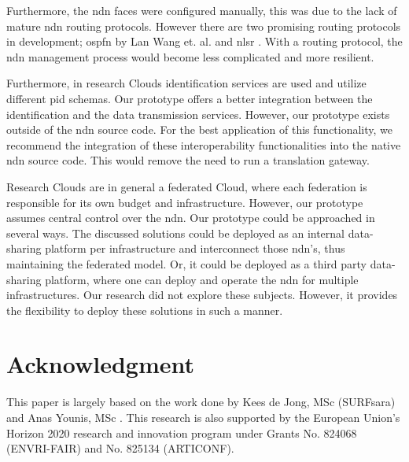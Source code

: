 \documentclass[conference]{IEEEtran}
\begin{document}
Furthermore, the \gls{ndn} faces were configured manually, this was due to the lack of mature \gls{ndn} routing protocols. However there are two promising routing protocols in development; \gls{ospfn} by Lan Wang et. al. \cite{ndn-ospfn2} and \gls{nlsr} \cite{nlsr}. With a routing protocol, the \gls{ndn} management process would become less complicated and more resilient.

Furthermore, in research Clouds identification services are used and utilize different \gls{pid} schemas. Our prototype offers a better integration between the identification and the data transmission services. However, our prototype exists outside of the \gls{ndn} source code. For the best application of this functionality, we recommend the integration of these interoperability functionalities into the native \gls{ndn} source code. This would remove the need to run a translation gateway.

Research Clouds are in general a federated Cloud, where each federation is responsible for its own budget and infrastructure. However, our prototype assumes central control over the \gls{ndn}. Our prototype could be approached in several ways. The discussed solutions could be deployed as an internal data-sharing platform per infrastructure and interconnect those \gls{ndn}'s, thus maintaining the federated model. Or, it could be deployed as a third party data-sharing platform, where one can deploy and operate the \gls{ndn} for multiple infrastructures. Our research did not explore these subjects. However, it provides the flexibility to deploy these solutions in such a manner.

\section*{Acknowledgment}
This paper is largely based on the work done by Kees de Jong, MSc (SURFsara) and Anas Younis, MSc \cite{de2019planning}. This research is also supported by the European Union’s Horizon 2020 research and innovation program under Grants
No. 824068 (ENVRI-FAIR) and No. 825134 (ARTICONF). 
\end{document}

